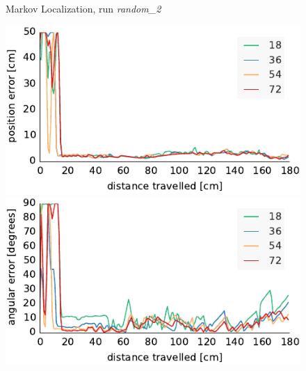 \documentclass[letterpaper, 10pt, conference]{ieeeconf}
\begin{document}
\begin{figure}
\begin{center}
Markov Localization, run \emph{random\_2}
\end{center}
\includegraphics{ml-whole_random_2-xy}\hfill
\includegraphics{ml-whole_random_2-theta}

\vspace{.5em}


\end{figure}
\end{document}
